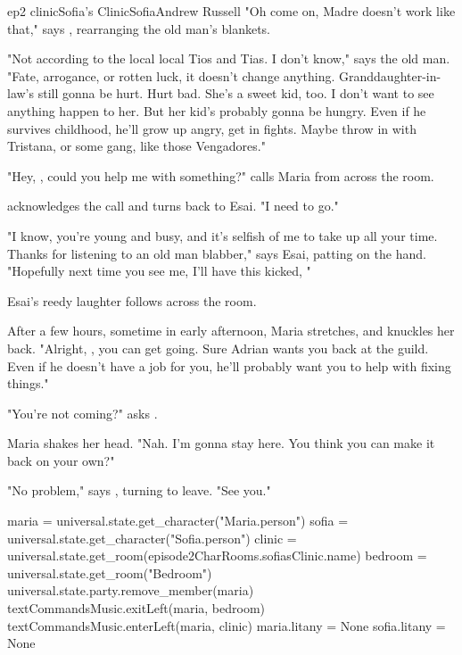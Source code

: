\documentclass{book}
\begin{document}
\begin{node}{ep2 clinic}{Sofia's Clinic}{Sofia}{Andrew Russell}
    "Oh come on, Madre doesn't work like that," says \name{}, rearranging the old man's blankets.  

    "Not according to the local local Tios and Tias. I don't know," says the old man. "Fate, arrogance, or rotten luck, it doesn't change anything. Granddaughter-in-law's still gonna be hurt. Hurt 
    bad. She's a sweet kid, too. I don't want to see anything happen to 
    her. But her kid's probably gonna be hungry. Even if he survives childhood, he'll grow up angry, get in fights. Maybe throw in with Tristana, or some gang, like those Vengadores."

    "Hey, \name{}, could you help me with something?" calls Maria from across the room.

    \name{} acknowledges the call and turns back to Esai. "I need to go."

    "I know, you're young and busy, and it's selfish of me to take up all your time. Thanks for listening to an old man blabber," says Esai, patting \name{} on the hand. "Hopefully next time you see me, I'll have this kicked, 
    "


    Esai's reedy laughter follows \name{} across the room.

    After a few hours, sometime in early afternoon, Maria stretches, and knuckles her back. "Alright, \name{}, you can get going. Sure Adrian wants you back at the guild. Even if he doesn't have a job for you, he'll probably want you to help with fixing
    things."

    "You're not coming?" asks \name{}.

    Maria shakes her head. "Nah. I'm gonna stay here. You think you can make it back on your own?"

    "No problem," says \name{}, turning to leave. "See you."

    \begin{code}

        maria = universal.state.get\_character("Maria.person")
        sofia = universal.state.get\_character("Sofia.person")
        clinic = universal.state.get\_room(episode2CharRooms.sofiasClinic.name)
        bedroom = universal.state.get\_room("Bedroom")
        universal.state.party.remove\_member(maria)
        textCommandsMusic.exitLeft(maria, bedroom)
        textCommandsMusic.enterLeft(maria, clinic)
        maria.litany = None
        sofia.litany = None

    \end{code}
        
\end{node}
\end{document}
